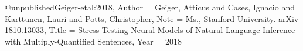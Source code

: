 @unpublished{Geiger-etal:2018,
  Author = {Geiger, Atticus  and  Cases, Ignacio  and Karttunen, Lauri  and  Potts, Christopher},
  Note = {Ms., Stanford University. arXiv 1810.13033},
  Title = {Stress-Testing Neural Models of Natural Language Inference with Multiply-Quantified Sentences},
  Year = {2018}}